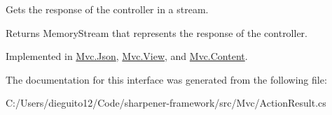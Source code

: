 Gets the response of the controller in a stream. 

\begin{DoxyReturn}{Returns}
Memory\+Stream that represents the response of the controller.
\end{DoxyReturn}


Implemented in \hyperlink{class_mvc_1_1_json_ae94043bfe0049a44c8b0c61a13b61ac9}{Mvc.\+Json}, \hyperlink{class_mvc_1_1_view_a8a5a1a1990be0c3704b4f3262c503a2a}{Mvc.\+View}, and \hyperlink{class_mvc_1_1_content_aabe147bc684eed8af000906fbfe92b61}{Mvc.\+Content}.



The documentation for this interface was generated from the following file\+:\begin{DoxyCompactItemize}
\item 
C\+:/\+Users/dieguito12/\+Code/sharpener-\/framework/src/\+Mvc/Action\+Result.\+cs\end{DoxyCompactItemize}
